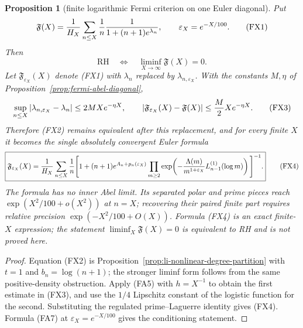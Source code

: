 \documentclass[11pt]{amsart}
\newtheorem{proposition}[theorem]{Proposition}
\theoremstyle{definition}
\theoremstyle{remark}
\theoremstyle{definition}
\newcommand{\RH}{\mathrm{RH}}
\begin{document}
\begin{proposition}[finite logarithmic Fermi criterion on one Euler diagonal]
\label{prop:li-finite-diagonal-fermi}
Put
\[
 \mathfrak F(X)={1\over H_X}\sum_{n\le X}{1\over n}
 {1\over1+(n+1)e^{\lambda_n}},\qquad
 \varepsilon_X=e^{-X/100}.                                 \tag{FX1}
\]
Then
\[
 \boxed{\quad\RH\quad\Longleftrightarrow\quad
       \liminf_{X\to\infty}\mathfrak F(X)=0.\quad}        \tag{FX2}
\]
Let $\mathfrak F_{\varepsilon_X}(X)$ denote (FX1) with
$\lambda_n$ replaced by $\lambda_{n,\varepsilon_X}$.  With the constants
$M,\eta$ of Proposition~\ref{prop:fermi-abel-diagonal},
\[
 \sup_{n\le X}|\lambda_{n,\varepsilon_X}-\lambda_n|
 \le2MXe^{-\eta X},\qquad
 |\mathfrak F_{\varepsilon_X}(X)-\mathfrak F(X)|
 \le {M\over2}Xe^{-\eta X}.                               \tag{FX3}
\]
Therefore (FX2) remains equivalent after this replacement, and for every
finite $X$ it becomes the single absolutely convergent Euler formula
\[
\boxed{
\begin{aligned}
 \mathfrak F_{\varepsilon_X}(X)
 ={1\over H_X}\sum_{n\le X}{1\over n}
 \Bigg[1+(n+1)e^{A_n+p_n(\varepsilon_X)}
 \prod_{m\ge2}\exp\!\left(
 -{\Lambda(m)\over m^{1+\varepsilon_X}}
 L_{n-1}^{(1)}(\log m)\right)\Bigg]^{-1}.
\end{aligned}}                                               \tag{FX4}
\]
The formula has no inner Abel limit.  Its separated polar and prime pieces
reach $\exp(X^2/100+o(X^2))$ at $n=X$; recovering their paired finite part
requires relative precision $\exp(-X^2/100+O(X))$.  Formula (FX4) is an
exact finite-$X$ expression; the statement $\liminf_X\mathfrak F(X)=0$ is
equivalent to RH and is not proved here.
\end{proposition}

\begin{proof}
Equation (FX2) is Proposition~\ref{prop:li-nonlinear-degree-partition} with
$t=1$ and $b_n=\log(n+1)$; the stronger liminf form follows from the same
positive-density obstruction.  Apply (FA5) with $h=X^{-1}$ to obtain the
first estimate in (FX3), and use the $1/4$ Lipschitz constant of the
logistic function for the second.  Substituting the regulated
prime--Laguerre identity gives (FX4).  Formula (FA7) at
$\varepsilon_X=e^{-X/100}$ gives the conditioning statement.
\end{proof}
\end{document}

